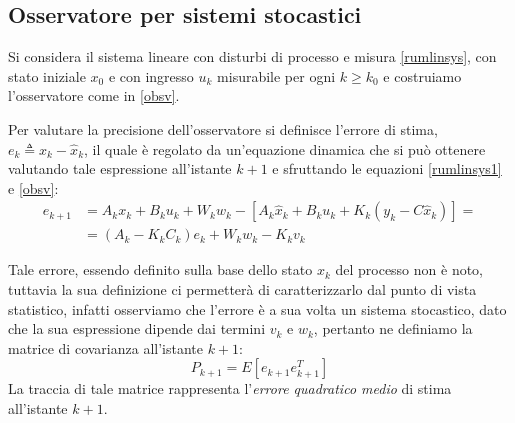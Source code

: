 \subsection{Osservatore per sistemi stocastici}
Si considera il sistema lineare con disturbi di processo e misura \eqref{rumlinsys}, con stato iniziale $x_0$ e con ingresso $u_k$ misurabile per ogni $k \geq k_0$ e costruiamo l'osservatore come in \eqref{obsv}.

Per valutare la precisione dell'osservatore si definisce l'errore di stima, \\ $e_k \triangleq x_k-\hat{x}_k$, il quale è regolato da un'equazione dinamica che si può ottenere valutando tale espressione all'istante $k+1$ e sfruttando le equazioni \eqref{rumlinsys1} e \eqref{obsv}:
\begin{equation}
\label{errore}
\begin{split}
e_{k+1}&=A_kx_k+B_ku_k+W_kw_k-[A_k\hat{x}_k+B_ku_k+K_k(y_k-C\hat{x}_k)] = \\
&=(A_k-K_kC_k)e_k+W_kw_k-K_kv_k
\end{split}
\end{equation}

Tale errore, essendo definito sulla base dello stato $x_k$ del processo non è noto, tuttavia la sua definizione ci permetterà di caratterizzarlo dal punto di vista statistico, infatti osserviamo che l'errore è a sua volta un sistema stocastico, dato che la sua espressione dipende dai termini $v_k$ e $w_k$, pertanto ne definiamo la matrice di covarianza all'istante $k+1$:
\begin{equation}
\label{matrcov}
P_{k+1}=E[e_{k+1}e_{k+1}^T]
\end{equation}
La traccia di tale matrice rappresenta l'\textit{errore quadratico medio} di stima all'istante $k+1$.


